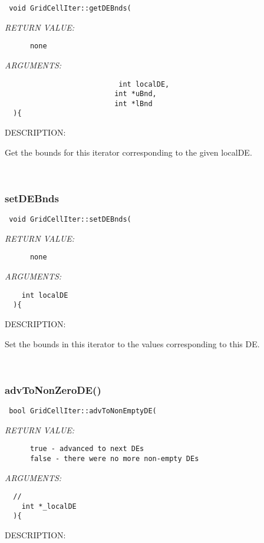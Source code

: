   
\begin{verbatim} void GridCellIter::getDEBnds(\end{verbatim}{\em RETURN VALUE:}
\begin{verbatim}      none\end{verbatim}{\em ARGUMENTS:}
\begin{verbatim}    
                           int localDE,
                          int *uBnd,
                          int *lBnd
  ){\end{verbatim}
{\sf DESCRIPTION:\\ }


   Get the bounds for this iterator corresponding to the given localDE. 
   
 
\mbox{}\hrulefill\
 
\subsubsection [setDEBnds] {setDEBnds}


  
\begin{verbatim} void GridCellIter::setDEBnds(\end{verbatim}{\em RETURN VALUE:}
\begin{verbatim}      none\end{verbatim}{\em ARGUMENTS:}
\begin{verbatim}    
    int localDE
  ){\end{verbatim}
{\sf DESCRIPTION:\\ }


   Set the bounds in this iterator to the values corresponding to
   this DE. 
   
 
\mbox{}\hrulefill\
 
\subsubsection [advToNonZeroDE()] {advToNonZeroDE()}


  
\begin{verbatim} bool GridCellIter::advToNonEmptyDE(\end{verbatim}{\em RETURN VALUE:}
\begin{verbatim}      true - advanced to next DEs
      false - there were no more non-empty DEs\end{verbatim}{\em ARGUMENTS:}
\begin{verbatim}  //  
    int *_localDE
  ){\end{verbatim}
{\sf DESCRIPTION:\\ }


